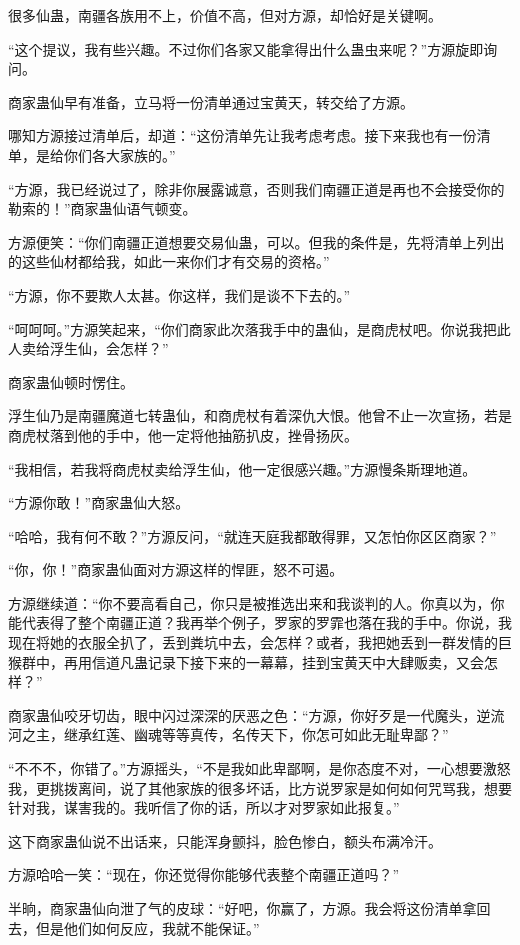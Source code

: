 \begin{this_body}
很多仙蛊，南疆各族用不上，价值不高，但对方源，却恰好是关键啊。

“这个提议，我有些兴趣。不过你们各家又能拿得出什么蛊虫来呢？”方源旋即询问。

商家蛊仙早有准备，立马将一份清单通过宝黄天，转交给了方源。

哪知方源接过清单后，却道：“这份清单先让我考虑考虑。接下来我也有一份清单，是给你们各大家族的。”

“方源，我已经说过了，除非你展露诚意，否则我们南疆正道是再也不会接受你的勒索的！”商家蛊仙语气顿变。

方源便笑：“你们南疆正道想要交易仙蛊，可以。但我的条件是，先将清单上列出的这些仙材都给我，如此一来你们才有交易的资格。”

“方源，你不要欺人太甚。你这样，我们是谈不下去的。”

“呵呵呵。”方源笑起来，“你们商家此次落我手中的蛊仙，是商虎杖吧。你说我把此人卖给浮生仙，会怎样？”

商家蛊仙顿时愣住。

浮生仙乃是南疆魔道七转蛊仙，和商虎杖有着深仇大恨。他曾不止一次宣扬，若是商虎杖落到他的手中，他一定将他抽筋扒皮，挫骨扬灰。

“我相信，若我将商虎杖卖给浮生仙，他一定很感兴趣。”方源慢条斯理地道。

“方源你敢！”商家蛊仙大怒。

“哈哈，我有何不敢？”方源反问，“就连天庭我都敢得罪，又怎怕你区区商家？”

“你，你！”商家蛊仙面对方源这样的悍匪，怒不可遏。

方源继续道：“你不要高看自己，你只是被推选出来和我谈判的人。你真以为，你能代表得了整个南疆正道？我再举个例子，罗家的罗霏也落在我的手中。你说，我现在将她的衣服全扒了，丢到粪坑中去，会怎样？或者，我把她丢到一群发情的巨猴群中，再用信道凡蛊记录下接下来的一幕幕，挂到宝黄天中大肆贩卖，又会怎样？”

商家蛊仙咬牙切齿，眼中闪过深深的厌恶之色：“方源，你好歹是一代魔头，逆流河之主，继承红莲、幽魂等等真传，名传天下，你怎可如此无耻卑鄙？”

“不不不，你错了。”方源摇头，“不是我如此卑鄙啊，是你态度不对，一心想要激怒我，更挑拨离间，说了其他家族的很多坏话，比方说罗家是如何如何咒骂我，想要针对我，谋害我的。我听信了你的话，所以才对罗家如此报复。”

这下商家蛊仙说不出话来，只能浑身颤抖，脸色惨白，额头布满冷汗。

方源哈哈一笑：“现在，你还觉得你能够代表整个南疆正道吗？”

半晌，商家蛊仙向泄了气的皮球：“好吧，你赢了，方源。我会将这份清单拿回去，但是他们如何反应，我就不能保证。”


\end{this_body}
